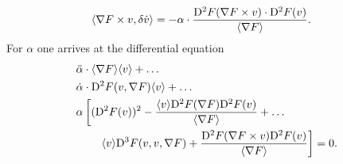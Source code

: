 \begin{align}
    \langle  \nabla F  \times v ,  \delta \dot{ v }  \rangle  &=
    -\alpha \cdot \frac{ \mathrm{D}^{ 2 } F ( \nabla F  \times v ) \cdot \mathrm{D}^{ 2 } F ( v ) }{ \langle  \nabla F   \rangle } .
\end{align}
For $ \alpha $ one arrives at the differential equation
\begin{align}
    &\ddot{ \alpha } \cdot \langle  \nabla F   \rangle \langle  v  \rangle  +  \dots\nonumber\\
    &\dot{ \alpha } \cdot \mathrm{D}^{ 2 } F ( v, \nabla F  ) \langle  v  \rangle  +  \dots\nonumber\\
    &\alpha \left[ ( \mathrm{D}^{ 2 } F ( v ) )^2  -
    \frac{ \langle  v  \rangle \mathrm{D}^{ 2 } F ( \nabla F  ) \mathrm{D}^{ 2 } F ( v ) }{ \langle  \nabla F   \rangle }  +  \dots\right.\nonumber\\
    &\qquad\left.\langle  v  \rangle \mathrm{D}^{ 3 } F ( v, v, \nabla F  )  +
    \frac{ \mathrm{D}^{ 2 } F ( \nabla F  \times v ) \mathrm{D}^{ 2 } F ( v ) }{ \langle  \nabla F   \rangle } \right]  =  0 .
\end{align}